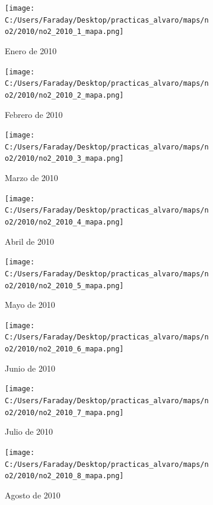 \documentclass[12pt]{article}
\begin{document}
\begin{figure}[H]
\centering
\begin{subfigure}[h]{0.45\textwidth}
\texttt{[image: C:/Users/Faraday/Desktop/practicas\_alvaro/maps/no2/2010/no2\_2010\_1\_mapa.png]}
\caption{Enero de 2010}
\label{fig:map-mon-1-1-2010}
\end{subfigure}
%
\begin{subfigure}[H]{0.45\textwidth}
\texttt{[image: C:/Users/Faraday/Desktop/practicas\_alvaro/maps/no2/2010/no2\_2010\_2\_mapa.png]}
\caption{Febrero de 2010}
\label{fig:map-mon-1-2-2010}
\end{subfigure}
\caption{}
\end{figure}

\begin{figure}[H]
\centering
\begin{subfigure}[h]{0.45\textwidth}
\texttt{[image: C:/Users/Faraday/Desktop/practicas\_alvaro/maps/no2/2010/no2\_2010\_3\_mapa.png]}
\caption{Marzo de 2010}
\label{fig:map-mon-1-3-2010}
\end{subfigure}
%
\begin{subfigure}[H]{0.45\textwidth}
\texttt{[image: C:/Users/Faraday/Desktop/practicas\_alvaro/maps/no2/2010/no2\_2010\_4\_mapa.png]}
\caption{Abril de 2010}
\label{fig:map-mon-1-4-2010}
\end{subfigure}
\caption{}
\end{figure}

\newpage

\begin{figure}[H]
\centering
\begin{subfigure}[h]{0.45\textwidth}
\texttt{[image: C:/Users/Faraday/Desktop/practicas\_alvaro/maps/no2/2010/no2\_2010\_5\_mapa.png]}
\caption{Mayo de 2010}
\label{fig:map-mon-1-5-2010}
\end{subfigure}
%
\begin{subfigure}[H]{0.45\textwidth}
\texttt{[image: C:/Users/Faraday/Desktop/practicas\_alvaro/maps/no2/2010/no2\_2010\_6\_mapa.png]}
\caption{Junio de 2010}
\label{fig:map-mon-1-6-2010}
\end{subfigure}
\caption{}
\end{figure}

\begin{figure}[H]
\centering
\begin{subfigure}[h]{0.45\textwidth}
\texttt{[image: C:/Users/Faraday/Desktop/practicas\_alvaro/maps/no2/2010/no2\_2010\_7\_mapa.png]}
\caption{Julio de 2010}
\label{fig:map-mon-1-7-2010}
\end{subfigure}
%
\begin{subfigure}[H]{0.45\textwidth}
\texttt{[image: C:/Users/Faraday/Desktop/practicas\_alvaro/maps/no2/2010/no2\_2010\_8\_mapa.png]}
\caption{Agosto de 2010}
\label{fig:map-mon-1-8-2010}
\end{subfigure}
\caption{}
\end{figure}
\end{document}
